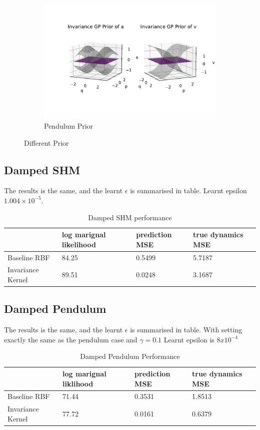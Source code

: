 \documentclass{statsmsc}
\begin{document}
\begin{figure}[H]
\begin{subfigure}[b]{\linewidth}
         \includegraphics[width=\linewidth]{../codes/figures/prior_pendulum_invariance.pdf}
         \caption{Pendulum Prior}
         \label{fig:prior_pendulum_invariance}
     \end{subfigure}
        \caption{Different Prior}
        \label{fig:priors}
\end{figure}



\subsection{Damped SHM}
The results is the same, and the learnt $\epsilon$ is summarised in table. Learnt epsilon 
$1.004\times 10^{-5}$.
\begin{table}[H]
  \centering
  \begin{tabular}{l l l l}
    \hline
                    & log marignal likelihood & prediction MSE  & true dynamics MSE\\
    \hline
Baseline RBF & 84.25 & 0.5499 & 5.7187 \\
Invariance Kernel & 89.51 & 0.0248  & 3.1687 \\
    \hline
  \end{tabular}
  \caption{Damped SHM performance }
  \label{tab:damped_shm_performance}
\end{table}

\subsection{Damped Pendulum}
The results is the same, and the learnt $\epsilon$ is summarised in table. With setting exactly the same as the pendulum case and $\gamma=0.1$
Learnt epsilon is $8x10^{-4}$
\begin{table}[H]
  \centering
  \begin{tabular}{l l l l}
    \hline
                    & log marignal liklihood & prediction MSE & true dynamics MSE\\
    \hline
Baseline RBF & 71.44 & 0.3531  & 1.8513 \\
Invariance Kernel & 77.72 & 0.0161  & 0.6379 \\
    \hline
  \end{tabular}
  \caption{Damped Pendulum Performance }
  \label{tab:damped_pendulum_performance_within_range}
\end{table}
\end{document}
